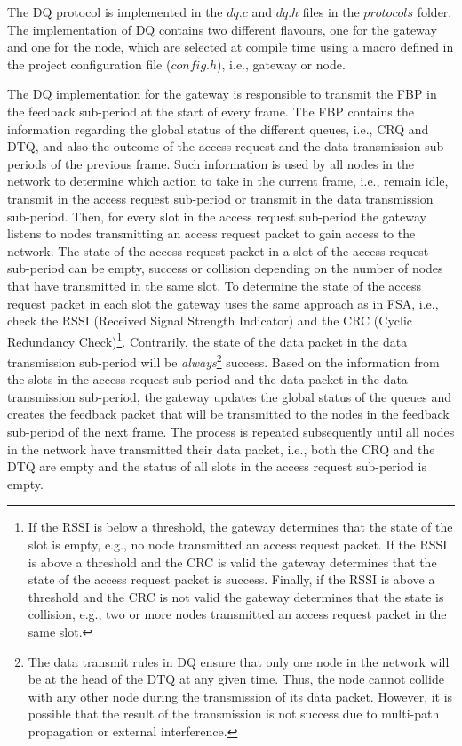 The DQ protocol is implemented in the $dq.c$ and $dq.h$ files in the $protocols$ folder. The implementation of DQ contains two different flavours, one for the gateway and one for the node, which are selected at compile time using a macro defined in the project configuration file ($config.h$), i.e., gateway or node. 

The DQ implementation for the gateway is responsible to transmit the FBP in the feedback sub-period at the start of every frame. The FBP contains the information regarding the global status of the different queues, i.e., CRQ and DTQ, and also the outcome of the access request and the data transmission sub-periods of the previous frame. Such information is used by all nodes in the network to determine which action to take in the current frame, i.e., remain idle, transmit in the access request sub-period or transmit in the data transmission sub-period. Then, for every slot in the access request sub-period the gateway listens to nodes transmitting an access request packet to gain access to the network. The state of the access request packet in a slot of the access request sub-period can be empty, success or collision depending on the number of nodes that have transmitted in the same slot. To determine the state of the access request packet in each slot the gateway uses the same approach as in FSA, i.e., check the RSSI (Received Signal Strength Indicator) and the CRC (Cyclic Redundancy Check)\footnote{If the RSSI is below a threshold, the gateway determines that the state of the slot is empty, e.g., no node transmitted an access request packet. If the RSSI is above a threshold and the CRC is valid the gateway determines that the state of the access request packet is success. Finally, if the RSSI is above a threshold and the CRC is not valid the gateway determines that the state  is collision, e.g., two or more nodes transmitted an access request packet in the same slot.}. Contrarily, the state of the data packet in the data transmission sub-period will be \textit{always}\footnote{The data transmit rules in DQ ensure that only one node in the network will be at the head of the DTQ at any given time. Thus, the node cannot collide with any other node during the transmission of its data packet. However, it is possible that the result of the transmission is not success due to multi-path propagation or external interference.} success. Based on the information from the slots in the access request sub-period and the data packet in the data transmission sub-period, the gateway updates the global status of the queues and creates the feedback packet that will be transmitted to the nodes in the feedback sub-period of the next frame. The process is repeated subsequently until all nodes in the network have transmitted their data packet, i.e., both the CRQ and the DTQ are empty and the status of all slots in the access request sub-period is empty.

